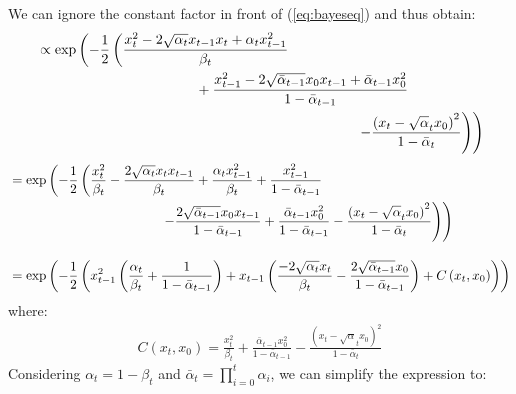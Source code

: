 \documentclass{article}
\numberwithin{equation}{section}
\numberwithin{figure}{section}
\begin{document}
We can ignore the constant factor in front of (\ref{eq:bayeseq}) and thus obtain:
\begin{align}
  &\propto \exp\left(- \frac{1}{2} \left(\frac{x_t^2 - 2 \sqrt{\alpha_t} x_{t-1} x_t + \alpha_t x_{t-1}^2}{\beta_t} \right. \right. \\
  & \hspace{4cm} + \frac{x_{t-1}^2 - 2 \sqrt{\bar{\alpha}_{t-1}} x_0 x_{t-1} + \bar{\alpha}_{t-1} x_0^2}{ 1 - \bar{\alpha}_{t-1}}  \notag \\
  & \left. \left. \hspace{8cm} - \frac{\left(x_t - \sqrt{\alpha}_t x_0\right)^2}{1 - \bar{\alpha}_{t}}\right) \right) \notag
\end{align}
\begin{align}
  &= \exp\left(- \frac{1}{2} \left(\frac{x_t^2}{\beta_t} - \frac{2 \sqrt{\alpha_t} x_t x_{t-1}}{\beta_t} + \frac{\alpha_t x_{t-1}^2}{\beta_t} + \frac{x_{t-1}^2}{1 - \bar{\alpha}_{t-1}} \right. \right. \\
  & \left. \left. \hspace{4cm}  - \frac{2 \sqrt{\bar{\alpha}_{t-1}} x_0 x_{t-1}}{1 - \bar{\alpha}_{t-1}} + \frac{\bar{\alpha}_{t-1} x_0^2}{1 - \bar{\alpha}_{t-1}} - \frac{\left(x_t - \sqrt{\alpha}_t x_0\right)^2}{1 - \bar{\alpha}_{t}}\right) \right) \notag \\[10pt]
  &= \exp\left(- \frac{1}{2} \left(x_{t-1}^2 \left(\frac{\alpha_t}{\beta_t} + \frac{1}{1 - \bar{\alpha}_{t-1}}\right) + x_{t-1} \left(\frac{-2 \sqrt{\alpha_t} x_t}{\beta_t} - \frac{2 \sqrt{\bar{\alpha}_{t-1}} x_0 }{1 - \bar{\alpha}_{t-1}}\right) + C\left(x_t, x_0\right)\right) \right) 
\end{align}
where:
\begin{gather}
  C\left(x_t, x_0\right) = \frac{x_t^2}{\beta_t} + \frac{\bar{\alpha}_{t-1} x_0^2}{1 - \bar{\alpha}_{t-1}} - \frac{\left(x_t - \sqrt{\alpha}_t x_0\right)^2}{1 - \bar{\alpha}_{t}}
\end{gather}
Considering $\alpha_t = 1 - \beta_t$ and $\bar{\alpha}_t = \prod_{i=0}^{t}{\alpha_i}$, we can simplify the expression to:
\end{document}
